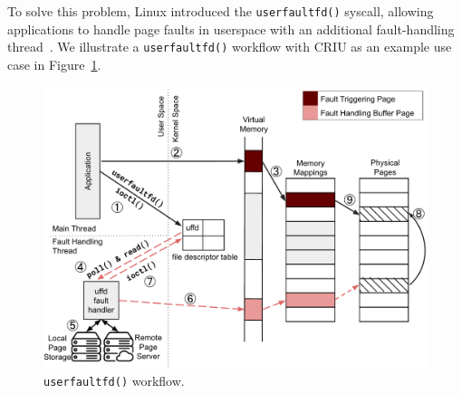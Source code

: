 

To solve this problem, Linux introduced the \texttt{userfaultfd()} syscall, allowing applications to handle page faults in userspace with an additional fault-handling thread~\cite{kernel_userfaultfd, uffd_presentation}. We illustrate a \texttt{userfaultfd()} workflow with CRIU as an example use case in Figure~\ref{fig:live-migration-diagram}.

\begin{figure}
    \centering
    \includegraphics[clip,scale=0.26]{figures/uffd-v7.0.pdf}
    \caption{\texttt{userfaultfd()} workflow. }
    \label{fig:live-migration-diagram}
\end{figure}

